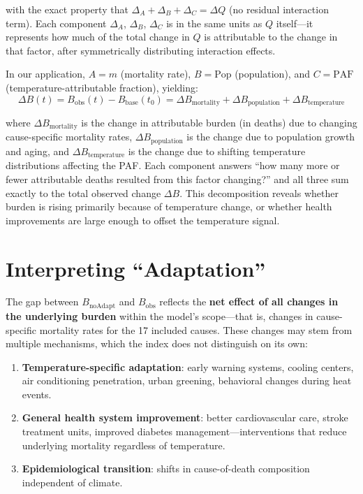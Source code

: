 \documentclass[11pt,a4paper]{article}
\begin{document}
with the exact property that $\Delta_A + \Delta_B + \Delta_C = \Delta Q$ (no residual interaction term). Each component $\Delta_A$, $\Delta_B$, $\Delta_C$ is in the same units as $Q$ itself---it represents how much of the total change in $Q$ is attributable to the change in that factor, after symmetrically distributing interaction effects.

In our application, $A = m$ (mortality rate), $B = \text{Pop}$ (population), and $C = \text{PAF}$ (temperature-attributable fraction), yielding:
\begin{equation}
  \Delta B(t) = B_{\text{obs}}(t) - B_{\text{base}}(t_0) = \Delta B_{\text{mortality}} + \Delta B_{\text{population}} + \Delta B_{\text{temperature}}
  \label{eq:dasgupta}
\end{equation}

where $\Delta B_{\text{mortality}}$ is the change in attributable burden (in deaths) due to changing cause-specific mortality rates, $\Delta B_{\text{population}}$ is the change due to population growth and aging, and $\Delta B_{\text{temperature}}$ is the change due to shifting temperature distributions affecting the PAF. Each component answers ``how many more or fewer attributable deaths resulted from this factor changing?'' and all three sum exactly to the total observed change $\Delta B$. This decomposition reveals whether burden is rising primarily because of temperature change, or whether health improvements are large enough to offset the temperature signal.

\section{Interpreting ``Adaptation''}

The gap between $B_{\text{noAdapt}}$ and $B_{\text{obs}}$ reflects the \textbf{net effect of all changes in the underlying burden} within the model's scope---that is, changes in cause-specific mortality rates for the 17 included causes. These changes may stem from multiple mechanisms, which the index does not distinguish on its own:

\begin{enumerate}[nosep]
  \item \textbf{Temperature-specific adaptation}: early warning systems, cooling centers, air conditioning penetration, urban greening, behavioral changes during heat events.
  \item \textbf{General health system improvement}: better cardiovascular care, stroke treatment units, improved diabetes management---interventions that reduce underlying mortality regardless of temperature.
  \item \textbf{Epidemiological transition}: shifts in cause-of-death composition independent of climate.
\end{enumerate}
\end{document}
